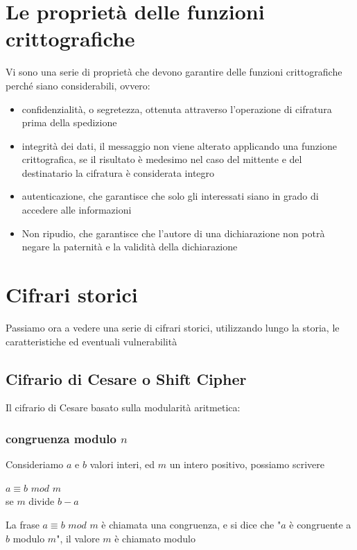 \documentclass[11pt, oneside]{article}   	%
\begin{document}
\section*{Le proprietà delle funzioni crittografiche}
Vi sono una serie di proprietà che devono garantire delle funzioni crittografiche perché siano considerabili, ovvero:
\begin{itemize}
\item confidenzialità, o segretezza, ottenuta attraverso l'operazione di cifratura prima della spedizione
\item integrità dei dati, il messaggio non viene alterato applicando una funzione crittografica, se il risultato è medesimo nel caso del mittente e del destinatario la cifratura è considerata integro
\item autenticazione, che garantisce che solo gli interessati siano in grado di accedere alle informazioni
\item Non ripudio, che garantisce che l'autore di una dichiarazione non potrà negare la paternità e la validità della dichiarazione 
\end{itemize}
\section*{Cifrari storici}
Passiamo ora a vedere una serie di cifrari storici, utilizzando lungo la storia, le caratteristiche ed eventuali vulnerabilità
\subsection*{Cifrario di Cesare o Shift Cipher}
Il cifrario di Cesare  basato sulla modularità aritmetica:
\subsubsection*{congruenza modulo $n$}
Consideriamo $a$ e $b$ valori interi, ed $m$ un intero positivo, possiamo scrivere
\begin{center}
$a \equiv b$ $mod$ $m$\\
se $m$ divide $b - a$
\end{center}
La frase $a \equiv b$ $mod$ $m$ è chiamata una congruenza, e si dice che "$a$ è congruente a $b$ modulo $m$", il valore $m$ è chiamato modulo\\
\end{document}
